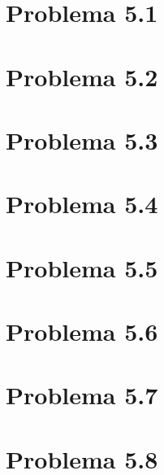 \section{Problema 5.1}  \label{problema5_1}

\newpage

\section{Problema 5.2}  \label{problema5_2}

\newpage

\section{Problema 5.3}  \label{problema5_3}

\newpage

\section{Problema 5.4}  \label{problema5_4}

\newpage

\section{Problema 5.5}  \label{problema5_5}

\newpage

\section{Problema 5.6}  \label{problema5_6}

\newpage

\section{Problema 5.7}  \label{problema5_7}

\newpage

\section{Problema 5.8}  \label{problema5_8}

